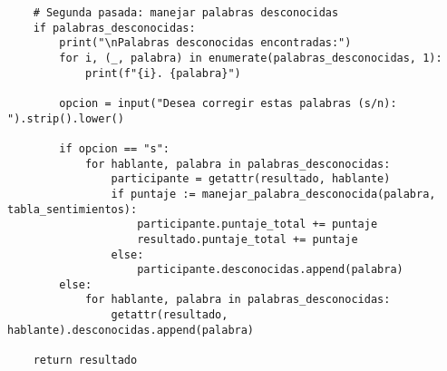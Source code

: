 \begin{lstlisting}
    # Segunda pasada: manejar palabras desconocidas
    if palabras_desconocidas:
        print("\nPalabras desconocidas encontradas:")
        for i, (_, palabra) in enumerate(palabras_desconocidas, 1):
            print(f"{i}. {palabra}")

        opcion = input("Desea corregir estas palabras (s/n): ").strip().lower()

        if opcion == "s":
            for hablante, palabra in palabras_desconocidas:
                participante = getattr(resultado, hablante)
                if puntaje := manejar_palabra_desconocida(palabra, tabla_sentimientos):
                    participante.puntaje_total += puntaje
                    resultado.puntaje_total += puntaje
                else:
                    participante.desconocidas.append(palabra)
        else:
            for hablante, palabra in palabras_desconocidas:
                getattr(resultado, hablante).desconocidas.append(palabra)

    return resultado
\end{lstlisting}

